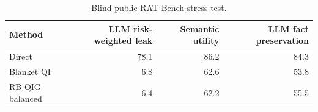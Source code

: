 \begin{table}[t]
\centering
\begingroup
\setlength{\tabcolsep}{3pt}
\small
\caption{Blind public RAT-Bench stress test.}
\label{tab:blind-public}
\begin{tabular}{lrrr}
\toprule
Method & LLM risk-weighted leak & Semantic utility & LLM fact preservation \\
\midrule
Direct & 78.1 & 86.2 & 84.3 \\
Blanket QI & 6.8 & 62.6 & 53.8 \\
RB-QIG balanced & 6.4 & 62.2 & 55.5 \\
\bottomrule
\end{tabular}
\endgroup
\end{table}
